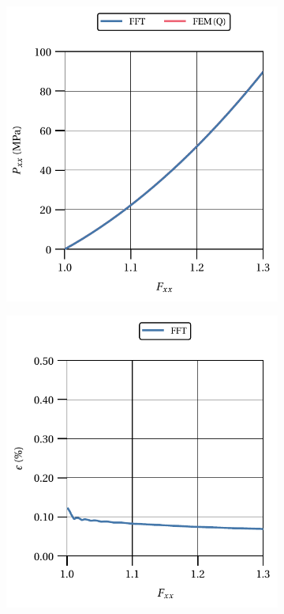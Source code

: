 \begin{figure}[hbt]
  \centering
	\begin{subfigure}[b]{0.49\textwidth}
    \centering
    \includegraphics[width=\textwidth]{figures/svk_2D_normal_material_response}
    \caption{}
    \label{subfig:svk_2D_normal_material_response}
  \end{subfigure}
  \begin{subfigure}[b]{0.49\textwidth}
    \centering
    \includegraphics[width=\textwidth]{figures/svk_2D_normal_material_response_error}

\end{subfigure}
\end{figure}
